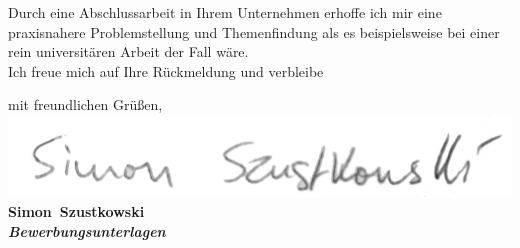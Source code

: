 \documentclass[11pt,a4paper]{article}
\def\firstname{Simon}
\def\familyname{Szustkowski}
\begin{document}
\par
Durch eine Abschlussarbeit in Ihrem Unternehmen erhoffe ich mir eine praxisnahere Problemstellung und Themenfindung als es beispielsweise bei einer rein universitären Arbeit der Fall wäre.\\

Ich freue mich auf Ihre Rückmeldung und verbleibe

  
mit freundlichen Grüßen,\\[3em] %
%
\includegraphics[scale=0.14]{unterschrift.jpg}\\
{\bfseries \firstname~\familyname}\\
%
\vfill%
{\slshape \bfseries Bewerbungsunterlagen}\\
\end{document}
